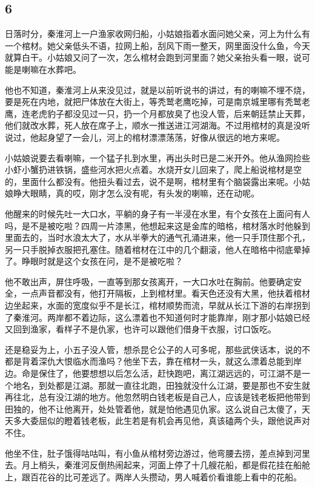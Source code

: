 {\centering\subsection{6}}

日落时分，秦淮河上一户渔家收网归船，小姑娘指着水面问她父亲，河上为什么有一个棺材。她父亲低头不语，拉网上船，刮风下雨一整天，网里面没什么鱼，今天就算白干。小姑娘又问了一次，怎么棺材会跑到河里面？她父亲抬头看一眼，说可能是喇嘛在水葬吧。

他也不知道，秦淮河上从来没见过，就是以前听说书的讲过，有的喇嘛不埋不烧，要是死在内地，就把尸体放在大街上，等秃鹫老鹰吃掉，可是南京城里哪有秃鹫老鹰，连老虎豹子都没见过一只，扔一个月都放臭了也没人管，后来朝廷禁止天葬，他们就改水葬，死人放在席子上，顺水一推送进江河湖海。不过用棺材的真是没听说过，他起身望了一会儿，河上的棺材漂漂荡荡，好像从很远的地方来呢。

小姑娘说要去看喇嘛，一个猛子扎到水里，再出头时已是二米开外。他从渔网捡些小虾小蟹扔进铁锅，盛些河水把火点着。水烧开女儿回来了，爬上船说棺材是空的，里面什么都没有。他扭头看过去，说不是啊，棺材里有个脑袋露出来呢。小姑娘睁大眼睛，真的哎，刚才怎么没有呢，有头发的喇嘛，还在动呢。

他醒来的时候先吐一大口水，平躺的身子有一半浸在水里，有个女孩在上面问有人吗，是不是被吃啦？四周一片漆黑，他想起来这是金库的暗格，棺材落水时他躲到里面去的，当时水浪太大了，水从半拳大的通气孔涌进来，他一只手顶住那个孔，另一只手脱掉衣服把孔塞住。随着棺材在江中的几个翻滚，他人在暗格中彻底晕掉了。睁眼时就是这个女孩在问，是不是被吃啦？

他不敢出声，屏住呼吸，一直等到那女孩离开，一大口水吐在胸前。他要确定安全，一点声音都没有，他打开隔板，上到棺材里。看天色还没有大黑，他扶着棺材边坐起来，水面的宽度似乎不是长江，棺材顺势而流，早就从长江下游的右岸拐到了秦淮河。两岸都不着边际，这么漂着也不知道何时才能靠岸，刚才那小姑娘已经又回到渔家，看样子不是仇家，也许可以跟他们借身干衣服，讨口饭吃。

还是稳妥为上，小五子没人管，想杀昆仑公子的人可多呢，那些武侠话本，说的不都是背着深仇大恨临水而渔吗？他坐下去，靠在棺材一头，就这么漂着总能到岸边。命是保住了，他要想想以后怎么活，赶快跑吧，离江湖远远的，可江湖不是一个地名，到处都是江湖。那就一直往北跑，田独就没什么江湖，要是那也不安生就再往北，总有没江湖的地方。他忽然明白钱老板是自己人，应该是钱老板把他带到田独的，他不让他离开，处处管着他，就是怕他遇见仇家。这么说自己太傻了，天天多大委屈似的瞪着钱老板，此生若是有机会再见他，真该磕两个头，跟他说声对不住。

他坐不住，肚子饿得咕咕叫，有小鱼从棺材旁边游过，他弯腰去捞，差点掉到河里去。月上梢头，秦淮河反倒热闹起来，河面上停了十几艘花船，都是假花挂在船舱上，跟百花谷的比可差远了。两岸人头攒动，男人喊着价看谁能上看中的花船。

